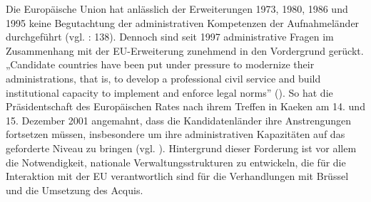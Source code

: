 Die Europäische Union hat anlässlich der Erweiterungen 1973, 1980, 1986 und 1995 keine Begutachtung der administrativen Kompetenzen der Aufnahmeländer durchgeführt (vgl. \cite{ziller}: 138). Dennoch sind seit 1997 administrative Fragen im Zusammenhang mit der EU-Erweiterung zunehmend in den Vordergrund gerückt. „Candidate countries have been put under pressure to modernize their administrations, that is, to develop a professional civil service and build institutional capacity to implement and enforce legal norms” (\cite{olsen}). So hat die Präsidentschaft des Europäischen Rates nach ihrem Treffen in Kaeken am 14. und 15. Dezember 2001 angemahnt, dass die Kandidatenländer ihre Anstrengungen fortsetzen müssen, insbesondere um ihre administrativen Kapazitäten auf das geforderte Niveau zu bringen (vgl. \cite{olsen}). Hintergrund dieser Forderung ist vor allem die Notwendigkeit, nationale Verwaltungsstrukturen zu entwickeln, die für die Interaktion mit der EU verantwortlich sind für die Verhandlungen mit Brüssel und die Umsetzung des Acquis.


